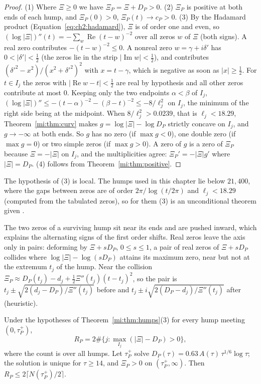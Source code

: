 \begin{proof}
(1) Where $\Xi\ge0$ we have $\Xi_P=\Xi+D_P>0$. (2) $\Xi_P$ is positive at both ends of each hump, and $\Xi_P(0)>0$, $\Xi_P(t)\to c_P>0$. (3) By the Hadamard product (Equation~\eqref{eq:ch2:hadamard}), $\Xi$ is of order one and even, so $(\log|\Xi|)''(t)=-\sum_w\operatorname{Re}(t-w)^{-2}$ over all zeros $w$ of $\Xi$ (both signs). A real zero contributes $-(t-w)^{-2}\le0$. A nonreal zero $w=\gamma+i\delta'$ has $0<|\delta'|<\tfrac12$ (the zeros lie in the strip $|\operatorname{Im}w|<\frac12$), and contributes $(\delta'^2-x^2)/(x^2+\delta'^2)^2$ with $x=t-\gamma$, which is negative as soon as $|x|\ge\tfrac12$. For $t\in I_j$ the zeros with $|\operatorname{Re}w-t|<\tfrac12$ are real by hypothesis and all other zeros contribute at most $0$. Keeping only the two endpoints $\alpha<\beta$ of $I_j$, $(\log|\Xi|)''\le-(t-\alpha)^{-2}-(\beta-t)^{-2}\le-8/\ell_j^2$ on $I_j$, the minimum of the right side being at the midpoint. When $8/\ell_j^2>0.0239$, that is $\ell_j<18.29$, Theorem~\ref{mi:thm:curv} makes $g=\log|\Xi|-\log D_P$ strictly concave on $I_j$, and $g\to-\infty$ at both ends. So $g$ has no zero (if $\max g<0$), one double zero (if $\max g=0$) or two simple zeros (if $\max g>0$). A zero of $g$ is a zero of $\Xi_P$ because $\Xi=-|\Xi|$ on $I_j$, and the multiplicities agree: $\Xi_P'=-|\Xi|g'$ where $|\Xi|=D_P$. (4) follows from Theorem~\ref{mi:thm:positive}.
\end{proof}

The hypothesis of (3) is local. The humps used in this chapter lie below $21{,}400$, where the gaps between zeros are of order $2\pi/\log(t/2\pi)$ and $\ell_j<18.29$ (computed from the tabulated zeros), so for them (3) is an unconditional theorem given \cite{PT21}.

The two zeros of a surviving hump sit near its ends and are pushed inward, which explains the alternating signs of the first order shifts. Real zeros leave the axis only in pairs: deforming by $\Xi+sD_P$, $0\le s\le1$, a pair of real zeros of $\Xi+sD_P$ collides where $\log|\Xi|-\log(sD_P)$ attains its maximum zero, near but not at the extremum $t_j$ of the hump. Near the collision $\Xi_P\approx D_P(t_j)-d_j+\tfrac12\Xi''(t_j)(t-t_j)^2$, so the pair is $t_j\pm\sqrt{2(d_j-D_P)/\Xi''(t_j)}$ before and $t_j\pm i\sqrt{2(D_P-d_j)/\Xi''(t_j)}$ after (heuristic).

\begin{theorem}[Count]\label{mi:thm:count}
Under the hypotheses of Theorem~\ref{mi:thm:humps}(3) for every hump meeting $(0,\tau_P^+)$,
\[
R_P=2\#\{j:\max_{I_j}(|\Xi|-D_P)>0\},
\]
where the count is over all humps. Let $\tau_P^+$ solve $D_P(\tau)=0.63\,A(\tau)\,\tau^{1/6}\log\tau$; the solution is unique for $\tau\ge14$, and $\Xi_P>0$ on $(\tau_P^+,\infty)$. Then $R_P\le2\lceil N(\tau_P^+)/2\rceil$.
\end{theorem}

